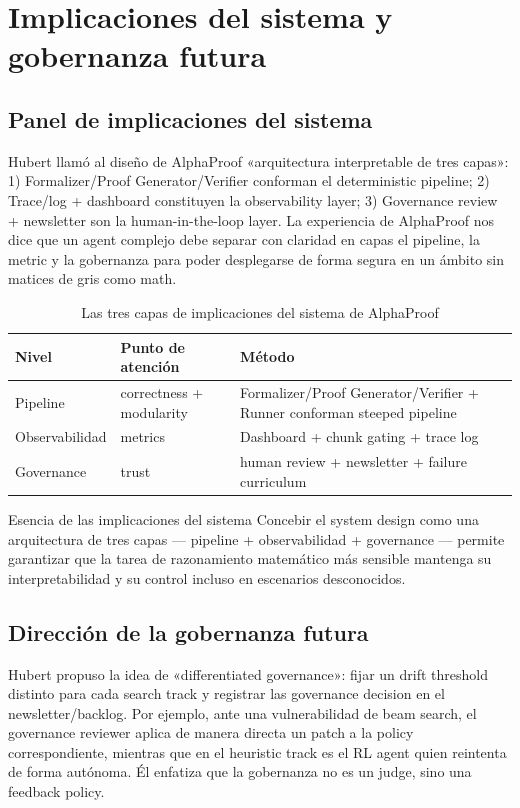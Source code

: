 \section{Implicaciones del sistema y gobernanza futura}

\subsection{Panel de implicaciones del sistema}
Hubert llamó al diseño de AlphaProof «arquitectura interpretable de tres capas»: 1) Formalizer/Proof Generator/Verifier conforman el deterministic pipeline; 2) Trace/log + dashboard constituyen la observability layer; 3) Governance review + newsletter son la human-in-the-loop layer. La experiencia de AlphaProof nos dice que un agent complejo debe separar con claridad en capas el pipeline, la metric y la gobernanza para poder desplegarse de forma segura en un ámbito sin matices de gris como math.

\begin{table}[H]
\centering
\begin{tabular}{p{3cm}p{4cm}p{5cm}}
\toprule
Nivel & Punto de atención & Método \\
\midrule
Pipeline & correctness + modularity & Formalizer/Proof Generator/Verifier + Runner conforman steeped pipeline \\
Observabilidad & metrics & Dashboard + chunk gating + trace log \\
Governance & trust & human review + newsletter + failure curriculum \\
\bottomrule
\end{tabular}
\caption{Las tres capas de implicaciones del sistema de AlphaProof}
\end{table}

\begin{knowledgebox}{Esencia de las implicaciones del sistema}
Concebir el system design como una arquitectura de tres capas — pipeline + observabilidad + governance — permite garantizar que la tarea de razonamiento matemático más sensible mantenga su interpretabilidad y su control incluso en escenarios desconocidos.
\end{knowledgebox}

\subsection{Dirección de la gobernanza futura}
Hubert propuso la idea de «differentiated governance»: fijar un drift threshold distinto para cada search track y registrar las governance decision en el newsletter/backlog. Por ejemplo, ante una vulnerabilidad de beam search, el governance reviewer aplica de manera directa un patch a la policy correspondiente, mientras que en el heuristic track es el RL agent quien reintenta de forma autónoma. Él enfatiza que la gobernanza no es un judge, sino una feedback policy.

